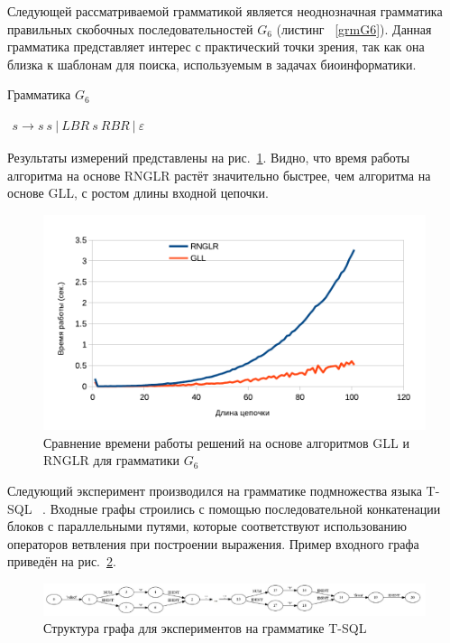Следующей рассматриваемой грамматикой является неоднозначная грамматика правильных скобочных последовательностей $G_6$ (листинг ~\ref{grmG6}). Данная грамматика представляет интерес с практический точки зрения, так как она близка к шаблонам для поиска, используемым в задачах биоинформатики. 

\begin{listing}
\caption{Грамматика $G_6$}
\label{grmG6}
\centering
$\begin{array}{rl}
s \rightarrow s \ s \ |  \ LBR \ s \ RBR \ | \ \varepsilon 
\end{array}$
\end{listing}

Результаты измерений представлены на рис.~\ref{exp2}. Видно, что время работы алгоритма на основе RNGLR растёт значительно быстрее, чем алгоритма на основе GLL, с ростом длины входной цепочки. 

\begin{figure}
 \centering
 \includegraphics[width=\textwidth]{Ragozina/pics/Brs.pdf}
 \caption{Сравнение времени работы решений на основе алгоритмов GLL и RNGLR для грамматики $G_6$}
 \label{exp2}
\end{figure}

Следующий эксперимент производился на грамматике подмножества языка T-SQL~\cite{YCZOO} . Входные графы строились с помощью последовательной конкатенации блоков с параллельными путями, которые соответствуют использованию операторов ветвления при построении выражения. Пример входного графа приведён на рис.~\ref{SQLInp}.

\begin{figure}
 \centering
 \includegraphics[width=\textwidth]{Ragozina/pics/SQLInput}
 \caption{Структура графа для экспериментов на грамматике T-SQL}
 \label{SQLInp}
\end{figure}

